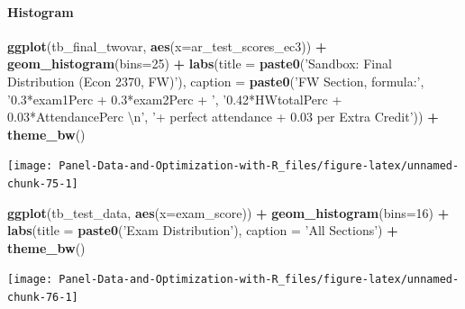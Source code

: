 \documentclass[
]{book}
\newenvironment{Shaded}{\begin{snugshade}}{\end{snugshade}}
\newcommand{\CharTok}[1]{\textcolor[rgb]{0.31,0.60,0.02}{#1}}
\newcommand{\DataTypeTok}[1]{\textcolor[rgb]{0.13,0.29,0.53}{#1}}
\newcommand{\DecValTok}[1]{\textcolor[rgb]{0.00,0.00,0.81}{#1}}
\newcommand{\KeywordTok}[1]{\textcolor[rgb]{0.13,0.29,0.53}{\textbf{#1}}}
\newcommand{\NormalTok}[1]{#1}
\newcommand{\OperatorTok}[1]{\textcolor[rgb]{0.81,0.36,0.00}{\textbf{#1}}}
\newcommand{\StringTok}[1]{\textcolor[rgb]{0.31,0.60,0.02}{#1}}
\begin{document}
\hypertarget{histogram-1}{%
\paragraph{Histogram}\label{histogram-1}}

\begin{Shaded}
\begin{Highlighting}[]
\KeywordTok{ggplot}\NormalTok{(tb_final_twovar, }\KeywordTok{aes}\NormalTok{(}\DataTypeTok{x=}\NormalTok{ar_test_scores_ec3)) }\OperatorTok{+}
\StringTok{  }\KeywordTok{geom_histogram}\NormalTok{(}\DataTypeTok{bins=}\DecValTok{25}\NormalTok{) }\OperatorTok{+}
\StringTok{  }\KeywordTok{labs}\NormalTok{(}\DataTypeTok{title =} \KeywordTok{paste0}\NormalTok{(}\StringTok{'Sandbox: Final Distribution (Econ 2370, FW)'}\NormalTok{),}
       \DataTypeTok{caption =} \KeywordTok{paste0}\NormalTok{(}\StringTok{'FW Section, formula:'}\NormalTok{,}
                        \StringTok{'0.3*exam1Perc + 0.3*exam2Perc + '}\NormalTok{,}
                        \StringTok{'0.42*HWtotalPerc + 0.03*AttendancePerc }\CharTok{\textbackslash{}n}\StringTok{'}\NormalTok{,}
                        \StringTok{'+ perfect attendance + 0.03 per Extra Credit'}\NormalTok{)) }\OperatorTok{+}
\StringTok{  }\KeywordTok{theme_bw}\NormalTok{()}
\end{Highlighting}
\end{Shaded}

\begin{center}\texttt{[image: Panel-Data-and-Optimization-with-R\_files/figure-latex/unnamed-chunk-75-1]} \end{center}

\begin{Shaded}
\begin{Highlighting}[]
\KeywordTok{ggplot}\NormalTok{(tb_test_data, }\KeywordTok{aes}\NormalTok{(}\DataTypeTok{x=}\NormalTok{exam_score)) }\OperatorTok{+}
\StringTok{  }\KeywordTok{geom_histogram}\NormalTok{(}\DataTypeTok{bins=}\DecValTok{16}\NormalTok{) }\OperatorTok{+}
\StringTok{  }\KeywordTok{labs}\NormalTok{(}\DataTypeTok{title =} \KeywordTok{paste0}\NormalTok{(}\StringTok{'Exam Distribution'}\NormalTok{),}
       \DataTypeTok{caption =} \StringTok{'All Sections'}\NormalTok{) }\OperatorTok{+}
\StringTok{  }\KeywordTok{theme_bw}\NormalTok{()}
\end{Highlighting}
\end{Shaded}

\begin{center}\texttt{[image: Panel-Data-and-Optimization-with-R\_files/figure-latex/unnamed-chunk-76-1]} \end{center}
\end{document}
